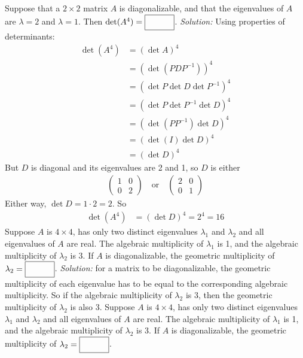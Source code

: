 \begin{parts}
    
    \ifnum {}
        Suppose that a $2\times 2$ matrix $A$ is diagonalizable, and that the eigenvalues of $A$ are $\lambda = 2$ and $\lambda= 1$. Then $\det(A^4) =  \framebox{\strut\hspace{1cm}}$. 
        \ifnum {} {\color{DarkBlue} \textit{Solution:} Using properties of determinants:
        \begin{align}
            \det(A^4) &= (\det A)^4 \\
            &= (\det (PDP^{-1}))^4 \\
            &= (\det P \det D \det P^{-1})^4\\
            &= (\det P  \det P^{-1} \det D)^4\\
            &= (\det (P P^{-1}) \det D)^4\\
            &= (\det (I) \det D)^4\\
            &= (\det D)^4
        \end{align}
        But $D$ is diagonal and its eigenvalues are 2 and 1, so $D$ is either 
        \begin{align}
            \begin{pmatrix} 1&0\\0&2\end{pmatrix} \quad \text{or} \quad \begin{pmatrix} 2&0\\0&1\end{pmatrix}
        \end{align}        
        Either way, $\det D = 1 \cdot 2 = 2$. So 
        \begin{align}
            \det(A^4) 
            &= (\det D)^4 = 2^4 = 16
        \end{align}        
        } \fi    
    \fi 
    \ifnum {}
        Suppose $A$ is $4\times4$, has only two distinct eigenvalues $\lambda_1$ and $\lambda_2$ and all eigenvalues of $A$ are real. The algebraic multiplicity of $\lambda_1$ is 1, and the algebraic multiplicity of $\lambda_2$ is 3. If $A$ is diagonalizable, the geometric multiplicity of $\lambda_2 = \framebox{\strut\hspace{1cm}}$. 
        \ifnum {} {\color{DarkBlue} \textit{Solution:} for a matrix to be diagonalizable, the geometric multiplicity of each eigenvalue has to be equal to the corresponding algebraic multiplicity. So if the algebraic multiplicity of $\lambda_2$ is 3, then the geometric multiplicity of $\lambda_2$ is also 3. } \fi     
    \fi 
    \ifnum {}
        Suppose $A$ is $4\times4$, has only two distinct eigenvalues $\lambda_1$ and $\lambda_2$ and all eigenvalues of $A$ are real. The algebraic multiplicity of $\lambda_1$ is 1, and the algebraic multiplicity of $\lambda_2$ is 3. If $A$ is diagonalizable, the geometric multiplicity of $\lambda_2 = \framebox{\strut\hspace{1cm}}$. 

\end{parts}
